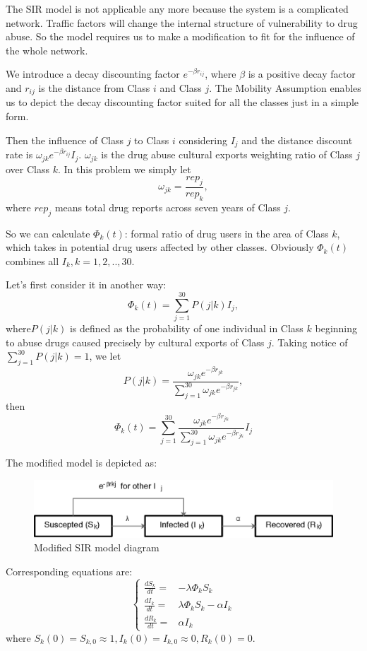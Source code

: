 \documentclass{mcmthesis}
\begin{document}
The SIR model is not applicable any more because the system is a complicated network. Traffic factors will change the internal structure of vulnerability to drug abuse. So the model requires us to make a modification to fit for the influence of the whole network.

We introduce a decay discounting factor $e^{-\beta r_{ij}}$, where $\beta$ is a positive decay factor and $r_{ij}$ is the distance from Class $i$ and Class $j$. The Mobility Assumption enables us to depict the decay discounting factor suited for all the classes just in a simple form. 

Then the influence of Class $j$ to Class $i$ considering $I_j$ and the distance discount rate is $\omega_{jk}e^{-\beta r_{ij}}I_j$. $\omega_{jk}$ is the drug abuse cultural exports weighting ratio of Class $j$ over Class $k$. In this problem we simply let$$\omega_{jk}=\dfrac{rep_j}{rep_k},$$ where $rep_j$ means total drug reports across seven years of Class $j$.

So we can calculate $\Phi_k(t)$: formal ratio of drug users in the area of Class $k$, which takes in potential drug users affected by other classes. Obviously $\Phi_k(t)$ combines all $I_k, k=1,2,..,30$. 

Let's first consider it in another way:
$$\Phi_k(t)=\sum_{j=1}^{30}P(j|k)I_j,$$
where$P(j|k)$ is defined as the probability of one individual in Class $k$ beginning to abuse drugs caused precisely by cultural exports of Class $j$. Taking notice of $\sum_{j=1}^{30}P(j|k)=1$, we let
$$P(j|k)=\dfrac{\omega_{jk}e^{-\beta r_{jk}}}{\sum_{j=1}^{30}\omega_{jk}e^{-\beta r_{jk}}},$$
then
$$\Phi_k(t)=\sum_{j=1}^{30}\dfrac{\omega_{jk}e^{-\beta r_{jk}}}{\sum_{j=1}^{30}\omega_{jk}e^{-\beta r_{jk}}}I_j$$

The modified model is depicted as:

\begin{figure}[htbp!]
	\includegraphics{figures/SIR2}
	\caption{Modified SIR model diagram}
\end{figure}

Corresponding equations are:
\[\begin{cases}
\tfrac{dS_k}{dt}= & -\lambda \Phi_k S_k\\
\tfrac{dI_k}{dt}= & \lambda \Phi_k S_k-\alpha I_k\\
\tfrac{dR_k}{dt}= & \alpha I_k
\end{cases} \]
where $S_k(0)=S_{k,0}\approx1,I_k(0)=I_{k,0}\approx0,R_k(0)=0$. 
\end{document}
